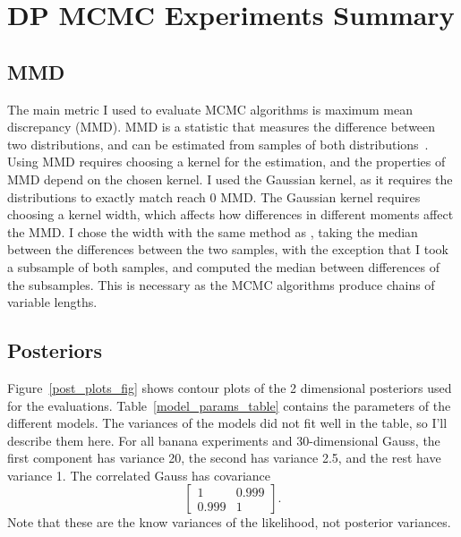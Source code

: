 ﻿\documentclass[a4paper]{article}
\begin{document}
\section{DP MCMC Experiments Summary}

\subsection{MMD}
The main metric I used to evaluate MCMC algorithms is maximum mean
discrepancy (MMD). MMD is a statistic that measures the difference
between two distributions, and can be estimated from samples of both
distributions~\cite{GrettonBRSS12}. Using MMD requires choosing a kernel
for the estimation, and the properties of MMD depend on the chosen kernel.
I used the Gaussian kernel, as it requires the distributions to exactly
match reach 0 MMD. The Gaussian kernel requires choosing a kernel width,
which affects how differences in different moments affect the MMD.
I chose the width with the same method as \textcite{GrettonBRSS12},
taking the median between the differences between the two samples,
with the exception that I took a subsample of both samples, and
computed the median between differences of the subsamples. This is necessary
as the MCMC algorithms produce chains of variable lengths.

\subsection{Posteriors}

Figure~\ref{post_plots_fig} shows contour plots of the 2 dimensional
posteriors used for the evaluations. Table~\ref{model_params_table}
contains the parameters of the different models. The variances of
the models did not fit well in the table, so I'll describe them here.
For all banana experiments and 30-dimensional Gauss,
the first component has variance 20, the second has variance 2.5, and
the rest have variance 1. The correlated Gauss has covariance
\[
  \begin{bmatrix}
	1 & 0.999 \\
    0.999 & 1
  \end{bmatrix}.
\]
Note that these are the know variances of the likelihood, not posterior
variances.



\end{document}
